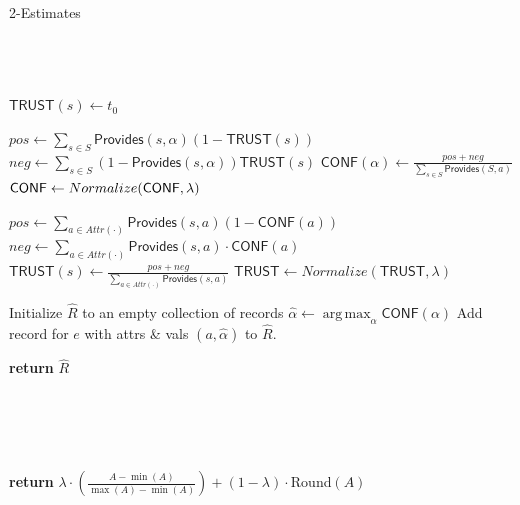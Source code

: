\documentclass{acm_proc_article-sp}
\DeclareMathOperator*{\argmax}{arg\,max}
\begin{document}
\begin{algorithm}[H]
	\small
\caption{2-Estimates}
\label{alg:2e} 
\begin{algorithmic}[1]
	 \\
	 \\
 \\
		\State  $\mathsf{TRUST}(s) \gets t_0$
	\EndFor

			\State $pos \leftarrow \sum_{s\in S} \mathsf{Provides}(s,\alpha){(1- \mathsf{TRUST}(s))}$
			\State $neg \gets \sum_{s\in S} (1-\mathsf{Provides}(s,\alpha)){\mathsf{TRUST}(s)}$
			\State $\mathsf{CONF}(\alpha) \gets \frac{pos + neg}{\sum_{s \in S} \mathsf{Provides}(S,a)}$ 
		\EndFor
	\EndFor
	\State $\mathsf{CONF} \leftarrow {\sc Normalize}(\mathsf{CONF},\lambda)$

		\State $pos \gets \sum_{a\in Attr(\cdot)}{\mathsf{Provides}(s,a)(1- \mathsf{CONF}(a))}$
		\State $neg \gets \sum_{a\in Attr(\cdot)}\mathsf{Provides}(s,a)\cdot{\mathsf{CONF}(a)}$ 
		\State $\mathsf{TRUST}(s) \gets \frac{pos + neg}{\sum_{a\in Attr(\cdot)}{\mathsf{Provides}(s,a)}}$ 
	\EndFor
	\State $\mathsf{TRUST} \gets Normalize(\mathsf{TRUST},\lambda)$

	\State Initialize $\hat{R}$ to an empty collection of records
		\State $\hat{\alpha} \leftarrow \argmax_{\alpha} \mathsf{CONF}(\alpha)$
		\EndFor
		\State Add record for $e$ with attrs \& vals $(a, \hat{\alpha})$ to $\hat{R}$.
	\EndFor

\EndWhile
\State \textbf{return} $\hat{R}$
\EndFunction

 \\

 \\
 \\
 \\

\State \textbf{return} $\lambda \cdot \left (\frac{A - \min(A)}{\max(A)-\min(A)} \right) + (1-\lambda) \cdot ${\sc Round}$( A )$

\EndFunction
\end{algorithmic}
\end{algorithm}  
\end{document}
